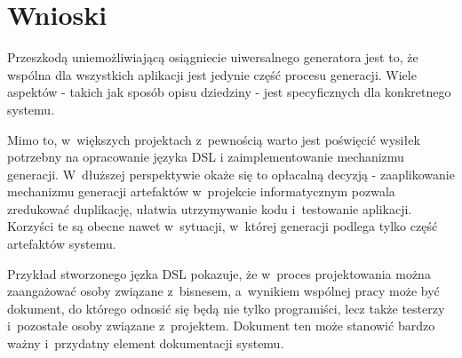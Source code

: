 \section{Wnioski}

Przeszkodą uniemożliwiającą osiągniecie uiwersalnego generatora jest to, że wspólna dla wszystkich aplikacji jest jedynie część procesu generacji.
Wiele aspektów - takich jak sposób opisu dziedziny - jest specyficznych dla konkretnego systemu.

Mimo to, w~większych projektach z~pewnością warto jest poświęcić wysiłek potrzebny na opracowanie języka DSL i zaimplementowanie mechanizmu generacji.
W~dłuższej perspektywie okaże się to opłacalną decyzją - zaaplikowanie mechanizmu generacji artefaktów w~projekcie informatycznym pozwala zredukować duplikację, ułatwia utrzymywanie kodu i~testowanie aplikacji.
Korzyści te są obecne nawet w~sytuacji, w~której  generacji podlega tylko część artefaktów systemu.

Przykład stworzonego jęzka DSL pokazuje, że w~proces projektowania można zaangażować osoby związane z~bisnesem, a~wynikiem wspólnej pracy może być dokument, do którego odnosić się będą nie tylko programiści, lecz także testerzy i~pozostałe osoby związane z~projektem.
Dokument ten może stanowić bardzo ważny i~przydatny element dokumentacji systemu.